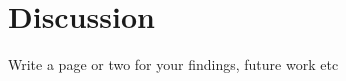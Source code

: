 \documentclass[../../main/thesis_msc.tex]{subfiles}
\begin{document}
	\chapter{Discussion}
	
		Write a page or two for your findings, future work etc
\end{document}
